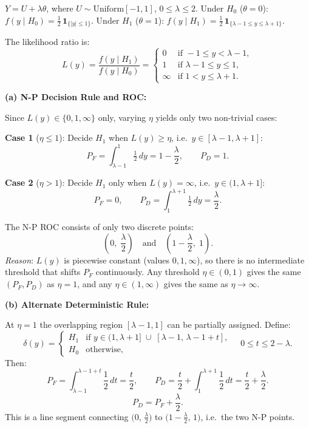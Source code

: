 \documentclass[12pt,a4paper,onecolumn]{exam}
\begin{document}
\begin{solution}

$Y = U + \lambda\theta$, where $U \sim \mathrm{Uniform}[-1,1]$, $0\leq\lambda\leq2$.
Under $H_0$ ($\theta=0$): $f(y\mid H_0)=\tfrac{1}{2}\,\mathbf{1}_{\{|y|\leq1\}}$.
Under $H_1$ ($\theta=1$): $f(y\mid H_1)=\tfrac{1}{2}\,\mathbf{1}_{\{\lambda-1\leq y\leq\lambda+1\}}$.

The likelihood ratio is:
\[
L(y) = \frac{f(y\mid H_1)}{f(y\mid H_0)}
= \begin{cases}
0      & \text{if } -1 \leq y < \lambda-1, \\
1      & \text{if } \lambda-1 \leq y \leq 1, \\
\infty & \text{if } 1 < y \leq \lambda+1.
\end{cases}
\]

\textbf{(a) N-P Decision Rule and ROC:}

Since $L(y) \in \{0,1,\infty\}$ only, varying $\eta$ yields only two non-trivial cases:

\textbf{Case 1} ($\eta \leq 1$): Decide $H_1$ when $L(y)\geq\eta$, i.e.\ $y\in[\lambda-1,\lambda+1]$:
\[
P_F = \int_{\lambda-1}^{1}\tfrac{1}{2}\,dy = 1 - \frac{\lambda}{2}, \qquad P_D = 1.
\]

\textbf{Case 2} ($\eta > 1$): Decide $H_1$ only when $L(y)=\infty$, i.e.\ $y\in(1,\lambda+1]$:
\[
P_F = 0, \qquad P_D = \int_{1}^{\lambda+1}\tfrac{1}{2}\,dy = \frac{\lambda}{2}.
\]

The N-P ROC consists of only two discrete points:
\[
\left(0,\;\frac{\lambda}{2}\right) \quad \text{and} \quad \left(1-\frac{\lambda}{2},\;1\right).
\]
\textit{Reason}: $L(y)$ is piecewise constant (values $0,1,\infty$), so there is no intermediate threshold that shifts $P_F$ continuously. Any threshold $\eta\in(0,1)$ gives the same $(P_F,P_D)$ as $\eta=1$, and any $\eta\in(1,\infty)$ gives the same as $\eta\to\infty$.

\textbf{(b) Alternate Deterministic Rule:}

At $\eta=1$ the overlapping region $[\lambda-1,1]$ can be partially assigned. Define:
\[
\delta(y) = \begin{cases}
H_1 & \text{if } y \in (1,\lambda+1] \;\cup\; [\lambda-1,\,\lambda-1+t], \\
H_0 & \text{otherwise,}
\end{cases}
\quad 0 \leq t \leq 2-\lambda.
\]
Then:
\[
P_F = \int_{\lambda-1}^{\lambda-1+t}\frac{1}{2}\,dt = \frac{t}{2},
\qquad
P_D = \frac{t}{2} + \int_{1}^{\lambda+1}\frac{1}{2}\,dt = \frac{t}{2} + \frac{\lambda}{2}.
\]
\[
\boxed{P_D = P_F + \frac{\lambda}{2}.}
\]
This is a line segment connecting $\bigl(0,\,\tfrac{\lambda}{2}\bigr)$ to $\bigl(1-\tfrac{\lambda}{2},\,1\bigr)$, i.e.\ the two N-P points.


\end{solution}
\end{document}
